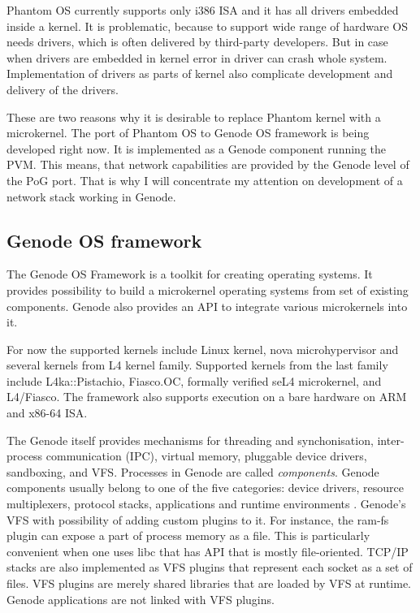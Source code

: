 Phantom OS currently supports only i386 ISA and it has all drivers embedded 
inside a kernel. It is problematic, because to support wide range of hardware
OS needs drivers, which is often delivered by third-party developers. But in
case when drivers are embedded in kernel error in driver can crash whole system.
Implementation of drivers as parts of kernel also complicate development and
delivery of the drivers.

These are two reasons why it is desirable to replace Phantom kernel with a
microkernel. The port of Phantom OS to Genode OS framework is being developed
right now. It is implemented as a Genode component running the PVM. This means,
that network capabilities are provided by the Genode level of the PoG port.
That is why I will concentrate my attention on development of a network stack
working in Genode.

\subsection{Genode OS framework} 
The Genode OS Framework \cite{genode_foundations} is a toolkit for creating 
operating systems. It provides possibility to build a microkernel operating
systems from set of existing components. Genode also provides an API to
integrate various microkernels into it.

For now the supported kernels include Linux kernel, nova microhypervisor and
several kernels from L4 kernel family. Supported kernels from the last family
include L4ka::Pistachio, Fiasco.OC, formally verified seL4 microkernel, and
L4/Fiasco.  The framework also supports execution on a bare hardware on ARM and
x86-64 ISA.

The Genode itself provides mechanisms for threading and synchonisation,
inter-process communication (IPC), virtual memory, pluggable device drivers,
sandboxing, and VFS. Processes in Genode are called \textit{components}. Genode
components usually belong to one of the five categories: device drivers,
resource multiplexers, protocol stacks, applications and runtime environments
\cite{genode_foundations}. Genode's VFS with possibility of adding custom
plugins to it. For instance, the ram-fs plugin can expose a part of process
memory as a file. This is particularly convenient when one uses libc that has
API that is mostly file-oriented. TCP/IP stacks are also implemented as VFS
plugins that represent each socket as a set of files. VFS plugins are merely
shared libraries that are loaded by VFS at runtime. Genode applications are not
linked with VFS plugins.

